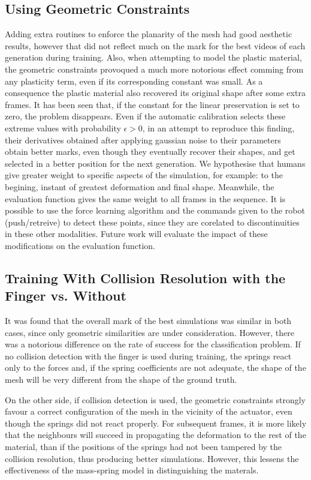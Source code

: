\documentclass[journal]{IEEEtran}
\newcounter{algorithm}
\begin{document}
\subsection{Using Geometric Constraints}
Adding extra routines to enforce the planarity of the mesh had good aesthetic results, however that did not reflect much on the mark for the best videos of each generation during training.   Also, when attempting to model the plastic material, the geometric constraints provoqued a much more notorious effect comming from any plasticity term, even if its corresponding constant was small.  As a consequence the plastic material also recovered its original shape after some extra frames.  It has been seen that, if the constant for the linear preservation is set to zero, the problem disappears.  Even if the automatic calibration selects these extreme values with probability $\epsilon>0$, in an attempt to reproduce this finding, their derivatives obtained after applying gaussian noise to their parameters obtain better marks, even though they eventually recover their shapes, and get selected in a better position for the next generation.  We hypothesise that humans give greater weight to specific aspects of the simulation, for example: to the begining, instant of greatest deformation and final shape.  Meanwhile, the evaluation function gives the same weight to all frames in the sequence.  It is possible to use the force learning algorithm and the commands given to the robot (push/retreive) to detect these points, since they are corelated to discontinuities in these other modalities.  Future work will evaluate the impact of these modifications on the evaluation function.

\subsection{Training With Collision Resolution with the Finger vs. Without}
It was found that the overall mark of the best simulations was similar in both cases, since only geometric similarities are under consideration.  However, there was a notorious difference on the rate of success for the classification problem.  If no collision detection with the finger is used during training, the springs react only to the forces and, if the spring coefficients are not adequate, the shape of the mesh will be very different from the shape of the ground truth.

On the other side, if collision detection is used, the geometric constraints strongly favour a correct configuration of the mesh in the vicinity of the actuator, even though the springs did not react properly.  For subsequent frames, it is more likely that the neighbours will succeed in propagating the deformation to the rest of the material, than if the positions of the springs had not been tampered by the collision resolution, thus producing better simulations.  However, this lessens the effectiveness of the mass-spring model in distinguishing the materals.
\end{document}
